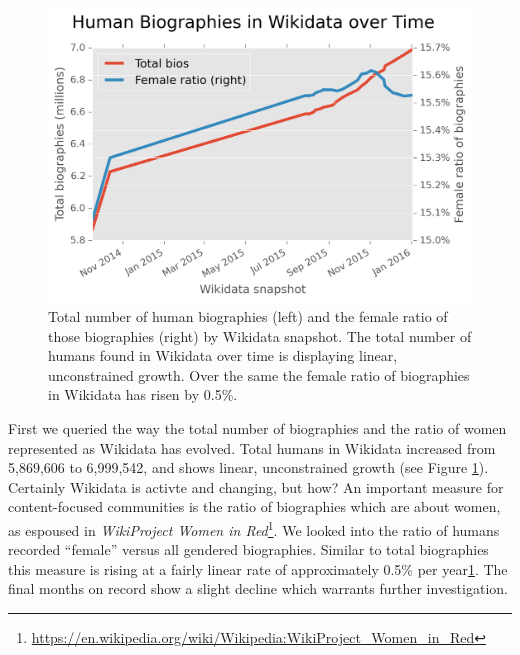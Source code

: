 \documentclass{sig-alternate-05-2015}
\begin{document}
\begin{figure}
\includegraphics[scale=0.53]{figures/totalfrb.png} 
\caption{Total number of human biographies (left) and the female ratio of those biographies (right) by Wikidata snapshot. The total number of humans found in Wikidata over time is displaying linear, unconstrained growth. Over the same  the female ratio of biographies in Wikidata has risen by 0.5\%.}
\label{fig:totalfrb}
\end{figure}

First we queried the way the total number of biographies and the ratio of women represented as Wikidata has evolved. Total humans in Wikidata increased from 5,869,606 to 6,999,542, and shows linear, unconstrained growth (see Figure \ref{fig:totalfrb}). Certainly Wikidata is activte and changing, but how? An important measure for content-focused communities is the ratio of biographies which are about women, as espoused in \textit{WikiProject Women in Red}\footnote{\url{https://en.wikipedia.org/wiki/Wikipedia:WikiProject_Women_in_Red}}. We looked into the ratio of  humans recorded ``female'' versus all gendered biographies. Similar to total biographies this measure is rising at a fairly linear rate of approximately 0.5\% per year\ref{fig:totalfrb}. The final months on record show a slight decline which warrants further investigation. 
\end{document}
